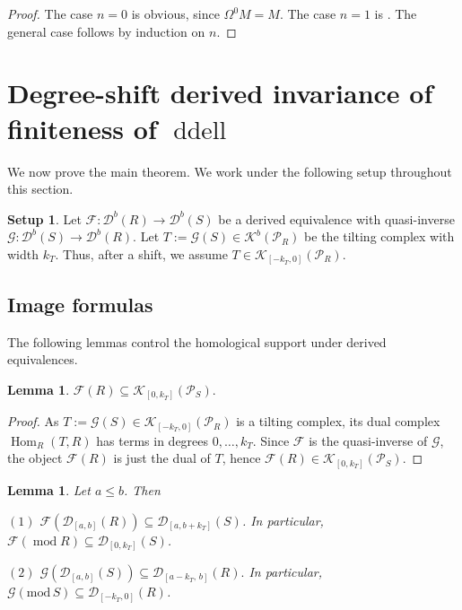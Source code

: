 \documentclass[12pt,a4paper,reqno]{amsart}
\theoremstyle{plain}
\newtheorem{lemma}[theorem]{Lemma}
\theoremstyle{definition}
\newtheorem{setup}[theorem]{Setup}
\theoremstyle{remark}
\DeclareMathOperator{\modd}{mod}
\DeclareMathOperator{\ddell}{ddell}
\newcommand{\D}{\mathcal{D}}
\newcommand{\Db}{\mathcal{D}^b}
\newcommand{\K}{\mathcal{K}}
\newcommand{\PR}{\mathcal{P}_R}
\begin{document}
\begin{proof}
The case $n=0$ is obvious, since $\Omega^{0}M=M$. The case $n=1$ is \cite[Lemmas 3.2 and 3.3]{GuoIgusa}. The general case follows by induction on $n$.
\end{proof}

\section{Degree-shift derived invariance of finiteness of $\ddell$}\label{sec:invariance}

We now prove the main theorem. We work under the following setup throughout this section.

\begin{setup}\label{setup:derived}
Let \(\mathcal{F}: \Db(R) \to \Db(S)\) be a derived equivalence with quasi-inverse \(\mathcal{G}: \Db(S) \to \Db(R)\). Let \(T := \mathcal{G}(S) \in \K^b(\PR)\) be the tilting complex with width $k_T$. Thus, after a shift, we assume \(T \in \K_{[-k_T,0]}(\PR)\).
\end{setup}

\subsection{Image formulas}

The following lemmas control the homological support under derived equivalences.

\begin{lemma}\label{lem:FR} $
\mathcal F(R) \subseteq \K_{[0,k_T]}(\mathcal P_S).$
\end{lemma}
\begin{proof}
As $T:=\mathcal G(S)\in \mathcal K_{[-k_T,0]}(\mathcal P_R)$ is a tilting complex, its dual complex $\operatorname{Hom}_R(T,R)$ has terms in degrees $0,\dots,k_T$. Since $\mathcal F$ is the quasi-inverse of $\mathcal G$, the object $\mathcal F(R)$ is just the dual of $T$, hence $\mathcal F(R)\in \mathcal K_{[0,k_T]}(\mathcal P_S)$. 
\end{proof}

\begin{lemma}\label{lem:image-bounded}
Let $a \leq b$. Then 

$(1)$ $ \mathcal{F}(\D_{[a,b]}(R)) \subseteq \D_{[a,b+k_T]}(S)$.
In particular, $\mathcal{F}(\modd R) \subseteq \D_{[0,k_T]}(S)$.

$(2)$ \(
\mathcal G(\D_{[a,b]}(S)) \subseteq \D_{[a-k_T,\, b]}(R).
\)
In particular, \(\mathcal G(\mathrm{mod}\,S)\subseteq \D_{[-k_T,0]}(R)\).
\end{lemma}
\end{document}
